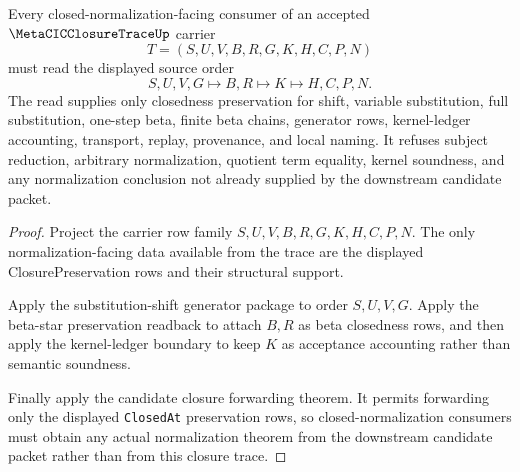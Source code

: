 \begin{theorem}
\label{thm:metacicclosuretrace-closed-normalization-source-order}
Every closed-normalization-facing consumer of an accepted $\MetaCICClosureTraceUp$ carrier
$$
T=(S,U,V,B,R,G,K,H,C,P,N)
$$
must read the displayed source order
$$
S,U,V,G \longmapsto B,R \longmapsto K \longmapsto H,C,P,N .
$$
The read supplies only closedness preservation for shift, variable substitution, full substitution, one-step beta, finite beta chains, generator rows, kernel-ledger accounting, transport, replay, provenance, and local naming. It refuses subject reduction, arbitrary normalization, quotient term equality, kernel soundness, and any normalization conclusion not already supplied by the downstream candidate packet.
\end{theorem}
\begin{proof}
Project the carrier row family $S,U,V,B,R,G,K,H,C,P,N$. The only normalization-facing data available from the trace are the displayed ClosurePreservation rows and their structural support.

Apply the substitution-shift generator package to order $S,U,V,G$. Apply the beta-star preservation readback to attach $B,R$ as beta closedness rows, and then apply the kernel-ledger boundary to keep $K$ as acceptance accounting rather than semantic soundness.

Finally apply the candidate closure forwarding theorem. It permits forwarding only the displayed \texttt{ClosedAt} preservation rows, so closed-normalization consumers must obtain any actual normalization theorem from the downstream candidate packet rather than from this closure trace.
\end{proof}

